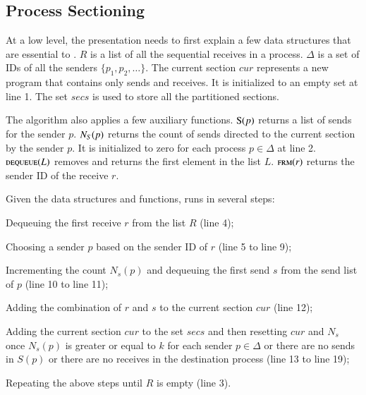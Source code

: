 \subsection{Process Sectioning}

At a low level, the presentation needs to first explain a few data structures that are essential to .
$R$ is a list of all the sequential receives in a process.
$\Delta$ is a set of IDs of all the senders $\{p_1, p_2, \ldots\}$.
The current section $\mathit{cur}$ represents a new program that contains only sends and receives. It is initialized to an empty set at line 1.
The set $\mathit{secs}$ is used to store all the partitioned sections.

The algorithm also applies a few auxiliary functions. 
$\Call{S}{p}$ returns a list of sends for the sender $p$.
$\Call{$N_S$}{p}$ returns the count of sends directed to the current section by the sender $p$. It is initialized to zero for each process $p \in \Delta$ at line 2.
$\Call{dequeue}{L}$ removes and returns the first element in the list $L$.
$\Call{frm}{r}$ returns the sender ID of the receive $r$.

Given the data structures and functions,  runs in several steps: 
\begin{compactenum}
\item Dequeuing the first receive $r$ from the list $R$ (line 4);
\item Choosing a sender $p$ based on the sender ID of $r$ (line 5 to line 9);
\item Incrementing the count $N_s(p)$ and dequeuing the first send $s$ from the send list of $p$ (line 10 to line 11);
\item Adding the combination of $r$ and $s$ to the current section $\mathit{cur}$ (line 12);
\item Adding the current section $\mathit{cur}$ to the set $\mathit{secs}$ and then resetting $\mathit{cur}$ and $N_s$ once $N_s(p)$ is greater or equal to $k$ for each sender $p\in\Delta$ or there are no sends in $S(p)$ or there are no receives in the destination process (line 13 to line 19);
\item Repeating the above steps until $R$ is empty (line 3).
\end{compactenum}



